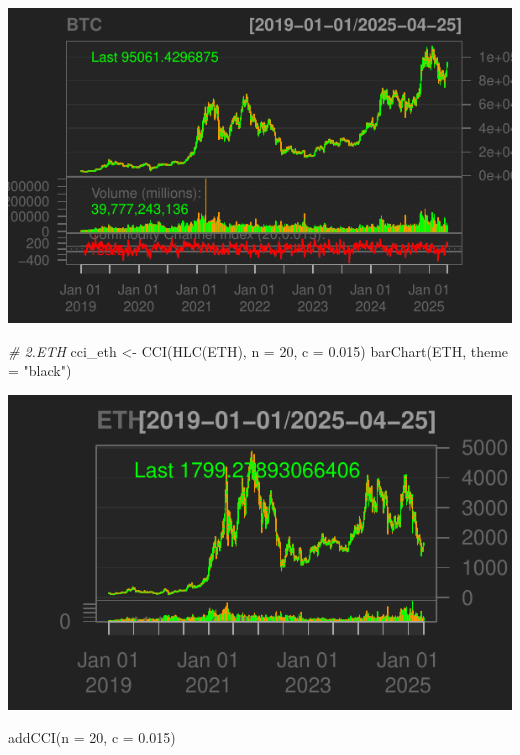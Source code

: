 \documentclass[]{tufte-handout}
\newenvironment{Shaded}{}{}
\newcommand{\AttributeTok}[1]{\textcolor[rgb]{0.49,0.56,0.16}{#1}}
\newcommand{\CommentTok}[1]{\textcolor[rgb]{0.38,0.63,0.69}{\textit{#1}}}
\newcommand{\DecValTok}[1]{\textcolor[rgb]{0.25,0.63,0.44}{#1}}
\newcommand{\FloatTok}[1]{\textcolor[rgb]{0.25,0.63,0.44}{#1}}
\newcommand{\FunctionTok}[1]{\textcolor[rgb]{0.02,0.16,0.49}{#1}}
\newcommand{\NormalTok}[1]{#1}
\newcommand{\OtherTok}[1]{\textcolor[rgb]{0.00,0.44,0.13}{#1}}
\newcommand{\StringTok}[1]{\textcolor[rgb]{0.25,0.44,0.63}{#1}}
\begin{document}
\includegraphics{cripto_update_files/figure-latex/unnamed-chunk-11-2}

\begin{Shaded}
\begin{Highlighting}[]
\CommentTok{\# 2.ETH}
\NormalTok{cci\_eth }\OtherTok{\textless{}{-}} \FunctionTok{CCI}\NormalTok{(}\FunctionTok{HLC}\NormalTok{(ETH), }\AttributeTok{n =} \DecValTok{20}\NormalTok{, }\AttributeTok{c =} \FloatTok{0.015}\NormalTok{)}
\FunctionTok{barChart}\NormalTok{(ETH, }\AttributeTok{theme =} \StringTok{"black"}\NormalTok{)}
\end{Highlighting}
\end{Shaded}

\includegraphics{cripto_update_files/figure-latex/unnamed-chunk-11-3}

\begin{Shaded}
\begin{Highlighting}[]
\FunctionTok{addCCI}\NormalTok{(}\AttributeTok{n =} \DecValTok{20}\NormalTok{, }\AttributeTok{c =} \FloatTok{0.015}\NormalTok{)}
\end{Highlighting}
\end{Shaded}
\end{document}

